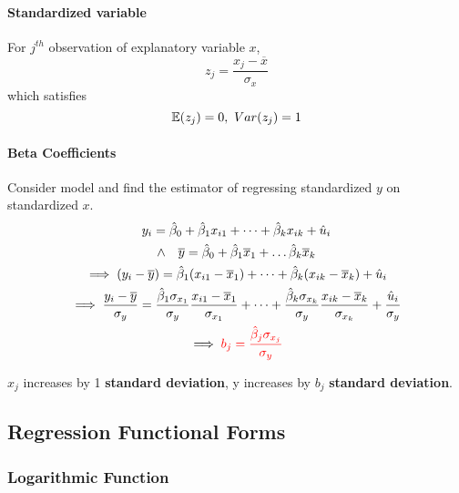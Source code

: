 \documentclass[]{article}
\begin{document}
    			\paragraph{Standardized variable} For $j^{th}$ observation of explanatory variable $x$, 
    				\[
    					z_j = \frac{x_j - \overline{x}}{\sigma_{x}}
    				\]
    				which satisfies
    				\[
    					\mathbb{E}({z_j}) = 0,\ Var(z_j) = 1
    				\]
    			\paragraph{Beta Coefficients} Consider model and find the estimator of regressing standardized $y$ on standardized $x$.
    				\begin{gather*}
    					y_i = \hat{\beta}_0 + \hat{\beta}_1 x_{i1} + \dots + \hat{\beta}_k x_{ik} + \hat{u}_i \\
    					\land \quad \overline{y} = \hat{\beta}_0 + \hat{\beta}_1 \overline{x}_1 + \dots \hat{\beta}_k \overline{x}_k \\
    					\implies (y_i - \overline{y}) = \hat{\beta}_1 (x_{i1} - \overline{x}_1) + \dots + \hat{\beta}_k (x_{ik} - \overline{x}_k) + \hat{u}_i \\
    					\implies \frac{y_i - \overline{y}}{\sigma_y} = 
    					\frac{\hat{\beta}_1 \sigma_{x_1}}{\sigma_y} \frac{x_{i1} - \overline{x}_1}{\sigma_{x_1}} + \dots + 
    					\frac{\hat{\beta}_k \sigma_{x_k}}{\sigma_y} \frac{x_{ik} - \overline{x}_k}{\sigma_{x_k}} + \frac{\hat{u}_i}{\sigma_y} \\
    					\implies \textcolor{red}{b_j = \frac{\hat{\beta}_j \sigma_{x_j}}{\sigma_y}}
    				\end{gather*}
    			\begin{remark}
    				$x_j$ increases by 1 \textbf{standard deviation}, y increases by $b_j$ \textbf{standard deviation}.
    			\end{remark}
    	\subsection{Regression Functional Forms}
    	\subsubsection{Logarithmic Function}
\end{document}

